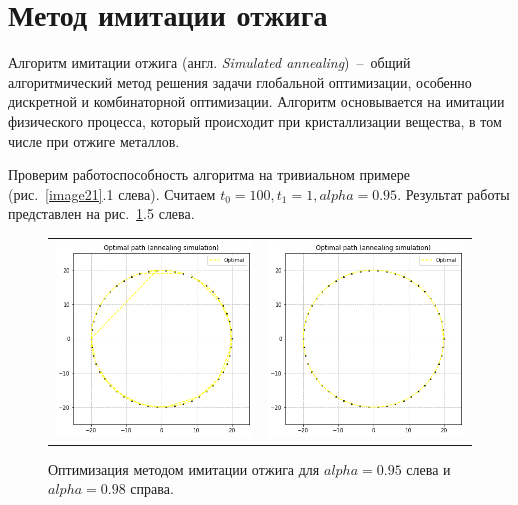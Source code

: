 \documentclass[12pt, a4paper]{article}
\begin{document}
    \section{Метод имитации отжига}
    
    Алгоритм имитации отжига (англ. \textit{Simulated annealing})~--~общий 
    алгоритмический метод решения задачи глобальной оптимизации, особенно 
    дискретной и комбинаторной оптимизации. Алгоритм основывается на 
    имитации физического процесса, который происходит при кристаллизации 
    вещества, в том числе при отжиге металлов.
    
    Проверим работоспособность алгоритма на тривиальном примере 
    (рис.~\ref{image21}.1 слева). Считаем $t_{0} = 100, t_{1} = 1, alpha = 
    0.95$. Результат работы представлен на рис.~\ref{image45}.5 слева.
    
    \begin{figure}[h!]
        \center
        \begin{tabular}{cc}
            \includegraphics[width = 6cm]{dots1_2_3.png} &
            \includegraphics[width = 6cm]{dots1_2_4.png} \\
        \end{tabular}
        \label{image45}
        \caption{Оптимизация методом имитации отжига для $alpha = 0.95$ 
            слева и $alpha = 0.98$ справа.}
    \end{figure}
    
\end{document}
